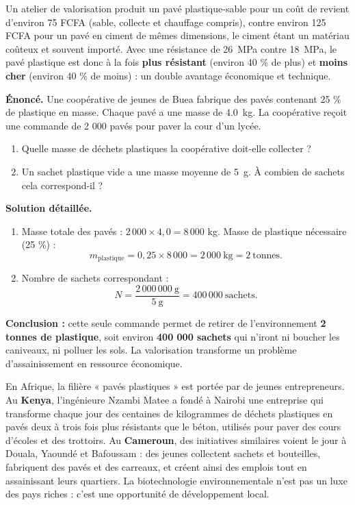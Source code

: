 \documentclass[11pt]{article}
\begin{document}
\begin{exemplebox}
Un atelier de valorisation produit un pavé plastique-sable pour un coût de revient d'environ 75 FCFA (sable, collecte et chauffage compris), contre environ 125 FCFA pour un pavé en ciment de mêmes dimensions, le ciment étant un matériau coûteux et souvent importé. Avec une résistance de \SI{26}{MPa} contre \SI{18}{MPa}, le pavé plastique est donc à la fois \textbf{plus résistant} (environ 40 \% de plus) et \textbf{moins cher} (environ 40 \% de moins) : un double avantage économique et technique.
\end{exemplebox}

\begin{exoresolu}
\textbf{Énoncé.} Une coopérative de jeunes de Buea fabrique des pavés contenant 25 \% de plastique en masse. Chaque pavé a une masse de \SI{4,0}{kg}. La coopérative reçoit une commande de 2 000 pavés pour paver la cour d'un lycée.
\begin{enumerate}
\item Quelle masse de déchets plastiques la coopérative doit-elle collecter ?
\item Un sachet plastique vide a une masse moyenne de \SI{5}{g}. À combien de sachets cela correspond-il ?
\end{enumerate}
\tcblower
\textbf{Solution détaillée.}
\begin{enumerate}
\item Masse totale des pavés : $2\,000 \times 4{,}0 = 8\,000$ kg. Masse de plastique nécessaire (25 \%) :
\[ m_{\text{plastique}} = 0{,}25 \times 8\,000 = 2\,000 \ \text{kg} = 2 \ \text{tonnes}. \]
\item Nombre de sachets correspondant :
\[ N = \frac{2\,000\,000 \ \text{g}}{5 \ \text{g}} = 400\,000 \ \text{sachets}. \]
\end{enumerate}
\textbf{Conclusion :} cette seule commande permet de retirer de l'environnement \textbf{2 tonnes de plastique}, soit environ \textbf{400 000 sachets} qui n'iront ni boucher les caniveaux, ni polluer les sols. La valorisation transforme un problème d'assainissement en ressource économique.
\end{exoresolu}

\begin{savaistu}
En Afrique, la filière « pavés plastiques » est portée par de jeunes entrepreneurs. Au \textbf{Kenya}, l'ingénieure Nzambi Matee a fondé à Nairobi une entreprise qui transforme chaque jour des centaines de kilogrammes de déchets plastiques en pavés deux à trois fois plus résistants que le béton, utilisés pour paver des cours d'écoles et des trottoirs. Au \textbf{Cameroun}, des initiatives similaires voient le jour à Douala, Yaoundé et Bafoussam : des jeunes collectent sachets et bouteilles, fabriquent des pavés et des carreaux, et créent ainsi des emplois tout en assainissant leurs quartiers. La biotechnologie environnementale n'est pas un luxe des pays riches : c'est une opportunité de développement local.
\end{savaistu}
\end{document}
